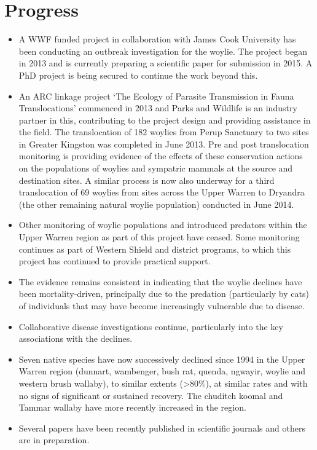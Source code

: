 \documentclass[version=last, paper=a4, DIV=18, usenames, dvipsnames]{scrartcl}
\begin{document}
\section*{Progress}
\begin{itemize}
\itemsep1pt\parskip0pt
\item
  A WWF funded project in collaboration with James Cook University has
  been conducting an outbreak investigation for the woylie. The project
  began in 2013 and is currently preparing a scientific paper for
  submission in 2015. A PhD project is being secured to continue the
  work beyond this.
\item
  An ARC linkage project `The Ecology of Parasite Transmission in Fauna
  Translocations' commenced in 2013 and Parks and Wildlife is an
  industry partner in this, contributing to the project design and
  providing assistance in the field. The translocation of 182 woylies
  from Perup Sanctuary to two sites in Greater Kingston was completed in
  June 2013. Pre and post translocation monitoring is providing evidence
  of the effects of these conservation actions on the populations of
  woylies and sympatric mammals at the source and destination sites. A
  similar process is now also underway for a third translocation of 69
  woylies from sites across the Upper Warren to Dryandra (the other
  remaining natural woylie population) conducted in June 2014.
\item
  Other monitoring of woylie populations and introduced predators within
  the Upper Warren region as part of this project have ceased. Some
  monitoring continues as part of Western Shield and district programs,
  to which this project has continued to provide practical support.
\item
  The evidence remains consistent in indicating that the woylie declines
  have been mortality-driven, principally due to the predation
  (particularly by cats) of individuals that may have become
  increasingly vulnerable due to disease.
\item
  Collaborative disease investigations continue, particularly into the
  key associations with the declines.
\item
  Seven native species have now successively declined since 1994 in the
  Upper Warren region (dunnart, wambenger, bush rat, quenda, ngwayir,
  woylie and western brush wallaby), to similar extents
  (\textgreater{}80\%), at similar rates and with no signs of
  significant or sustained recovery. The chuditch koomal and Tammar
  wallaby have more recently increased in the region.
\item
  Several papers have been recently published in scientific journals and
  others are in preparation.
\end{itemize}
\end{document}
